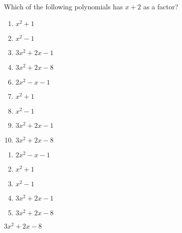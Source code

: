 

  Which of the following polynomials has $x+2$ as a factor?


\ifsat
	\begin{enumerate}[label=\Alph*)]
		\item  $x^{2}+1$
		\item  $x^{2}-1$
		\item  $3x^{2}+2x-1$
		\item  $3x^{2}+2x-8$%
	\end{enumerate}
\else
\fi

\ifacteven
	\begin{enumerate}[label=\textbf{\Alph*.},itemsep=\fill,align=left]
		\setcounter{enumii}{5}
		\item   $2x^{2}-x-1$
		\item  $x^{2}+1$
		\item  $x^{2}-1$
		\addtocounter{enumii}{1}
		\item  $3x^{2}+2x-1$
		\item  $3x^{2}+2x-8$%
	\end{enumerate}
\else
\fi

\ifactodd
	\begin{enumerate}[label=\textbf{\Alph*.},itemsep=\fill,align=left]
		\item   $2x^{2}-x-1$
		\item  $x^{2}+1$
		\item  $x^{2}-1$
		\item  $3x^{2}+2x-1$
		\item  $3x^{2}+2x-8$%
	\end{enumerate}
\else
\fi

\ifgridin
  $3x^{2}+2x-8$%

\else
\fi

